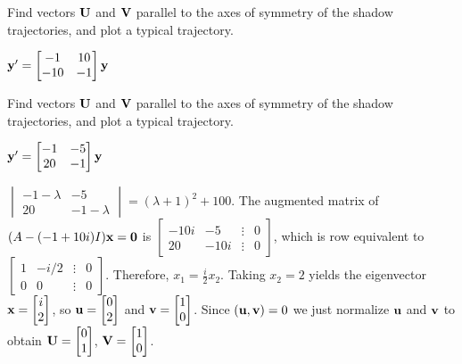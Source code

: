 \documentclass{ximera}
\begin{document}
 \begin{problem}\label{exer:10.6.37}   
 Find vectors
${\bf U}$ and ${\bf V}$ parallel to the axes of symmetry of the shadow
trajectories, and plot a typical trajectory.

$ {\bf y}'= \begin{bmatrix}-1&10\\-10&-1\end{bmatrix}{\bf y}$
 \end{problem}

 \begin{problem}\label{exer:10.6.38}    
 Find vectors
${\bf U}$ and ${\bf V}$ parallel to the axes of symmetry of the shadow
trajectories, and plot a typical trajectory.

$ {\bf y}'= \begin{bmatrix}-1&-5\\20&-1\end{bmatrix}{\bf y}$

\begin{solution}
    $\begin{vmatrix}-1-\lambda&-5\\20&-1-\lambda
\end{vmatrix}=(\lambda+1)^2+100$.
The augmented matrix of $(A-(-1+10i)I){\bf x}={\bf 0}$ is
$ \begin{bmatrix}-10i&-5&\vdots&0\\
20&-10i&\vdots&0  \end{bmatrix}$,
which is row equivalent to
$ \begin{bmatrix} 1&-i/2&\vdots&0\\ 0&0&\vdots&0
 \end{bmatrix}$.
Therefore, $x_1=\frac{i}{2}x_2$. Taking $x_2=2$
yields the eigenvector
 ${\bf x}= \begin{bmatrix}i\\2 \end{bmatrix}$,
so ${\bf u}=  \begin{bmatrix}0\\2\end{bmatrix}$ and ${\bf v}=  \begin{bmatrix}1\\0\end{bmatrix}$.
Since $({\bf u},{\bf v})=0$ we just normalize ${\bf u}$ and ${\bf v}$
to obtain
${\bf U}=  \begin{bmatrix}0\\1\end{bmatrix}$, ${\bf V}=  \begin{bmatrix}1\\0\end{bmatrix}$.
\end{solution}
 \end{problem}
 
\end{document}
